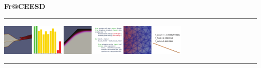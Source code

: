 \documentclass[aspectratio=169]{beamer}
\begin{document}
\begin{frame}\frametitle{}

\vspace*{0.2in}

\hspace*{0.0in}\textrm{{\huge\bfseries\color{myOrange} Fr@CEESD}}

\vspace*{0.2in}
\hrule
\begin{center}
\includegraphics[width=0.7\textwidth]{Figures/coverart-sim.pdf}
\end{center}
\hrule

\vspace*{0.1in}
\hfill{}   %

\end{frame}
\end{document}
